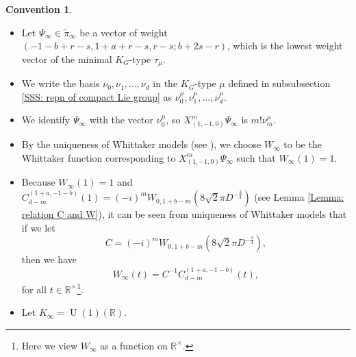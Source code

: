 \documentclass[11pt, a4paper]{amsart}
\theoremstyle{plain}
\theoremstyle{definition}
\newtheorem{convention}[theorem]{Convention}
\numberwithin{equation}{section}
\def\RR{\mathbb{R}}
\DeclareMathOperator{\U}{\mathrm{U}}
\begin{document}
\begin{convention}
    \begin{itemize}
        \item Let $\Psi_{\infty} \in \tilde{\pi}_{\infty}$ be a vector of weight $(-1 - b + r - s, 1 + a + r - s, r - s; b + 2s - r)$, which is the lowest weight vector of the minimal $K_{G}$-type $\tau_{\mu}$.
        \item We write the basis $\nu_0, \nu_1, \ldots, \nu_d$ in the $K_{G}$-type $\mu$ defined in subsubsection \ref{SSS: repn of compact Lie group} as $\nu_0^{\mu}, \nu_1^{\mu}, \ldots, \nu_d^{\mu}$. 
        \item We identify $\Psi_{\infty}$ with the vector $\nu_{0}^{\mu}$, so $X^{m}_{(1, -1, 0)}\Psi_{\infty}$ is $m! \nu_{m}^{\mu}$. 
        \item By the uniqueness of Whittaker models (see \cite[\S 3.2]{Koseki-Oda95}), we choose $W_{\infty}$ to be the Whittaker function corresponding to $X_{(1, -1, 0)}^{m} \Psi_{\infty}$ such that $W_{\infty}(1) = 1$.
        \item Because $W_{\infty}(1) = 1$ and $C_{d - m}^{(1 + a, -1-b)}(1) = (-i)^{m}W_{0, 1 + b - m}(8\sqrt{2}\pi D^{-\frac{3}{4}})$ (see Lemma \ref{Lemma: relation C and W}), it can be seen from uniqueness of Whittaker models that if we let 
        \begin{equation*}
            C = (-i)^{m}W_{0, 1 + b - m}(8\sqrt{2}\pi D^{-\frac{3}{4}}),
        \end{equation*}
        then we have 
        \begin{equation}
        \label{eq: infinite Whittaker and C}
            W_{\infty}(t) = C^{-1} C_{d - m}^{(1+a, -1-b)}(t),
        \end{equation}
        for all $t \in \RR^{\times}$\footnote{Here we view $W_{\infty}$ as a function on $\RR^{\times}$.}. 
        \item Let $K_{\infty} = \U(1)(\RR)$.
    \end{itemize}
    
\end{convention}
\end{document}
